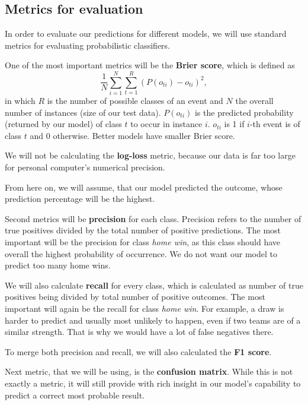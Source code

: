 \documentclass[conference]{IEEEtran}
\begin{document}
\subsection{Metrics for evaluation}

In order to evaluate our predictions for different models, we will use standard metrics for 
evaluating probabilistic classifiers. 

One of the most important metrics will be the \textbf{Brier score}, which is defined as 
$$\frac{1}{N} \sum_{i=1}^{N} \sum_{t=1}^{R} {(P(o_{ti}) - o_{ti})^2},$$ in which $R$ is the
number of possible classes of an event and $N$ the overall number of instances (size of our
test data). $P(o_{ti})$ is the predicted probability (returned by our model) of class $t$ 
to occur in instance $i$. $o_{ti}$ is 1 if $i$-th event is of class $t$ and 0 otherwise. 
Better models have smaller Brier score.

We will not be calculating the \textbf{log-loss} metric, because our data is far too large 
for personal computer's numerical precision.

From here on, we will assume, that our model predicted the outcome, whose prediction 
percentage will be the highest. 

Second metrics will be \textbf{precision} for each class. Precision refers to the number of 
true positives divided by the total number of positive predictions. The most important will 
be the precision for class \textit{home win}, as this class should have overall the highest 
probability of occurrence. We do not want our model to predict too many home wins.

We will also calculate \textbf{recall} for every class, which is calculated as number of true
positives being divided by total number of positive outcomes. The most important will again be the
recall for class \textit{home win}. For example, a draw is harder to predict and usually most unlikely to happen, 
even if two teams are of a similar strength. That is why we would have a lot of false negatives there.

To merge both precision and recall, we will also calculated the \textbf{F1 score}.

Next metric, that we will be using, is the \textbf{confusion matrix}. While this is not
exactly a metric, it will still provide with rich insight in our model's capability 
to predict a correct most probable result.
\end{document}
